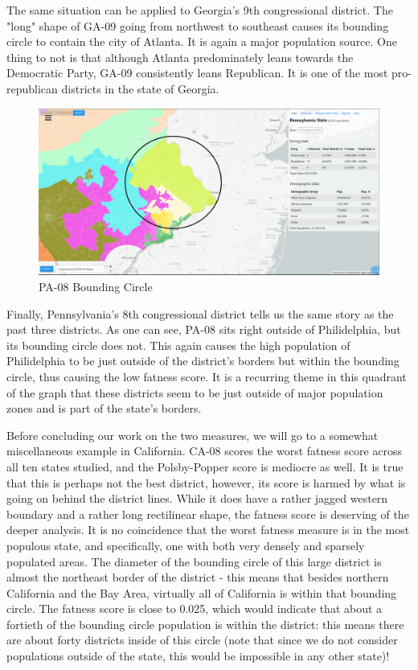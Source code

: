 \documentclass[letterpaper]{article}
\begin{document}
The same situation can be applied to Georgia's 9th congressional district. The "long" shape of GA-09 going from northwest to southeast causes its bounding circle to contain the city of Atlanta. It is again a major population source. One thing to not is that although Atlanta predominately leans towards the Democratic Party, GA-09 consistently leans Republican. It is one of the most pro-republican districts in the state of Georgia.

\begin{figure}[H]
	\includegraphics[width=\linewidth]{./figures/PA-08-BoundingCircle.png}
	\caption{PA-08 Bounding Circle}
	\label{fig:pa08boundingCircle}
\end{figure}

Finally, Pennsylvania's 8th congressional district tells us the same story as the past three districts. As one can see, PA-08 sits right outside of Philidelphia, but its bounding circle does not. This again causes the high population of Philidelphia to be just outside of the district's borders but within the bounding circle, thus causing the low fatness score. It is a recurring theme in this quadrant of the graph that these districts seem to be just outside of major population zones and is part of the state's borders.



Before concluding our work on the two measures, we will go to a somewhat miscellaneous example in California. CA-08 scores the worst fatness score across all ten states studied, and the Polsby-Popper score is mediocre as well. It is true that this is perhaps not the best district, however, its score is harmed by what is going on behind the district lines. While it does have a rather jagged western boundary and a rather long rectilinear shape, the fatness score is deserving of the deeper analysis. It is no coincidence that the worst fatness measure is in the most populous state, and specifically, one with both very densely and sparsely populated areas. The diameter of the bounding circle of this large district is almost the northeast border of the district - this means that besides northern California and the Bay Area, virtually all of California is within that bounding circle. The fatness score is close to 0.025, which would indicate that about a fortieth of the bounding circle population is within the district: this means there are about forty districts inside of this circle (note that since we do not consider populations outside of the state, this would be impossible in any other state)! 
\end{document}
